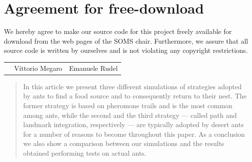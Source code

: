 \documentclass[11pt]{article}
\begin{document}

\newpage


\newpage
\section*{Agreement for free-download}
\bigskip

\bigskip


\large We hereby agree to make our source code for this project freely available for download from the web pages of the SOMS chair. Furthermore, we assure that all source code is written by ourselves and is not violating any copyright restrictions.

\begin{center}

\bigskip


\bigskip


\begin{tabular}{@{}p{3.3cm}@{}p{6cm}@{}@{}p{6cm}@{}}
\begin{minipage}{3cm}

\end{minipage}
&
\begin{minipage}{6cm}
\vspace{2mm} \large Vittorio Megaro
\vspace{\baselineskip}

\end{minipage}
&
\begin{minipage}{6cm}
\vspace{2mm} \large Emanuele Rudel
\vspace{\baselineskip}

\end{minipage}
\end{tabular}


\end{center}
\newpage









\begin{abstract}
In this article we present three different simulations of strategies adopted by ants to find a food source and to consequently return to their nest. The former strategy is based on pheromone trails and is the most common among ants, while the second and the third strategy --- called path and landmark integration, respectively --- are typically adopted by desert ants for a number of reasons to become throughout this paper. As a conclusion we also show a comparison between our simulations and the results obtained performing tests on actual ants.
\end{abstract}
\end{document}
